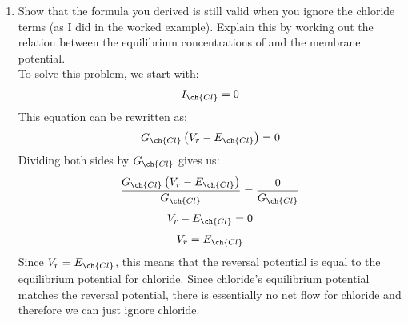 \documentclass[11pt]{article}
\begin{document}
\begin{enumerate}[label=\arabic*.]
\begin{enumerate}[label=(\alph*)]
\newpage
\item
Show that the formula you derived is still valid when you ignore the chloride terms (as I did in the worked example\text{*}). Explain this by working out the relation between the equilibrium concentrations of  and the membrane potential.
\vspace*{1\baselineskip}
\\
To solve this problem, we start with:
\begin{align*}
I_{\ch{Cl}} = 0
\end{align*}
This equation can be rewritten as:
\begin{align*}
G_{\ch{Cl}} \left(V_r - E_{\ch{Cl}}\right) = 0
\end{align*}
Dividing both sides by $G_{\ch{Cl}}$ gives us:
\begin{align*}
\frac{G_{\ch{Cl}} \left(V_r - E_{\ch{Cl}}\right)} {G_{\ch{Cl}}} = \frac{0} {G_{\ch{Cl}}}
\end{align*}
\begin{align*}
V_r - E_{\ch{Cl}} = 0
\end{align*}
\begin{align*}
V_r = E_{\ch{Cl}}
\end{align*}
Since $V_r = E_{\ch{Cl}}$, this means that the reversal potential is equal to the equilibrium potential for chloride. Since chloride's equilibrium potential matches the reversal potential, there is essentially no net flow for chloride and therefore we can just ignore chloride.
\end{enumerate}



\end{enumerate}
\end{document}
